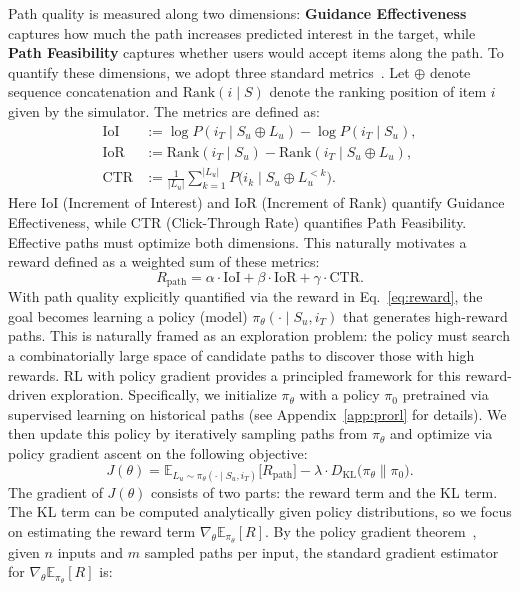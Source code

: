 Path quality is measured along two dimensions: \textbf{Guidance Effectiveness} captures how much the path increases predicted interest in the target, while \textbf{Path Feasibility} captures whether users would accept items along the path. To quantify these dimensions, we adopt three standard metrics~\cite{zhu2023influential,bi2024proactive}. Let $\oplus$ denote sequence concatenation and $\mathrm{Rank}(i \mid S)$ denote the ranking position of item $i$ given by the simulator. The metrics are defined as:
\begin{align}
\mathrm{IoI} &:= \log P(i_T \mid S_u \oplus L_u) - \log P(i_T \mid S_u), \nonumber\\
\mathrm{IoR} &:= \mathrm{Rank}(i_T \mid S_u) - \mathrm{Rank}(i_T \mid S_u \oplus L_u), \nonumber\\
\mathrm{CTR} &:= \frac{1}{|L_u|} \sum_{k=1}^{|L_u|} P\bigl(i_k \mid S_u \oplus L_u^{<k}\bigr). \nonumber
\end{align}
Here IoI (Increment of Interest) and IoR (Increment of Rank) quantify Guidance Effectiveness, while CTR (Click-Through Rate) quantifies Path Feasibility. Effective paths must optimize both dimensions. This naturally motivates a reward defined as a weighted sum of these metrics:
\begin{equation}
R_{\text{path}} = \alpha \cdot \mathrm{IoI} + \beta \cdot \mathrm{IoR} + \gamma \cdot \mathrm{CTR}.
\label{eq:reward}
\end{equation}
With path quality explicitly quantified via the reward in Eq.~\eqref{eq:reward}, the goal becomes learning a policy (model) $\pi_\theta(\cdot \mid S_u, i_T)$ that generates high-reward paths. This is naturally framed as an exploration problem: the policy must search a combinatorially large space of candidate paths to discover those with high rewards. 
RL with policy gradient provides a principled framework for this reward-driven exploration. Specifically, we initialize $\pi_\theta$ with a policy $\pi_0$ pretrained via supervised learning on historical paths (see Appendix~\ref{app:prorl} for details). We then update this policy by iteratively sampling paths from $\pi_\theta$ and optimize via policy gradient ascent on the following objective:
\begin{equation}
J(\theta) = \mathbb{E}_{L_u \sim \pi_\theta(\cdot \mid S_u, i_T)}\bigl[R_{\text{path}}\bigr] - \lambda \cdot D_{\mathrm{KL}}\bigl(\pi_\theta \| \pi_0\bigr).
\label{eq:objective}
\end{equation}
The gradient of $J(\theta)$ consists of two parts: the reward term and the KL term. The KL term can be computed analytically given policy distributions, so we focus on estimating the reward term $\nabla_\theta \mathbb{E}_{\pi_\theta}[R]$. By the policy gradient theorem~\cite{sutton1999policy}, given $n$ inputs and $m$ sampled paths per input, the standard gradient estimator for $\nabla_\theta \mathbb{E}_{\pi_\theta}[R]$ is:
